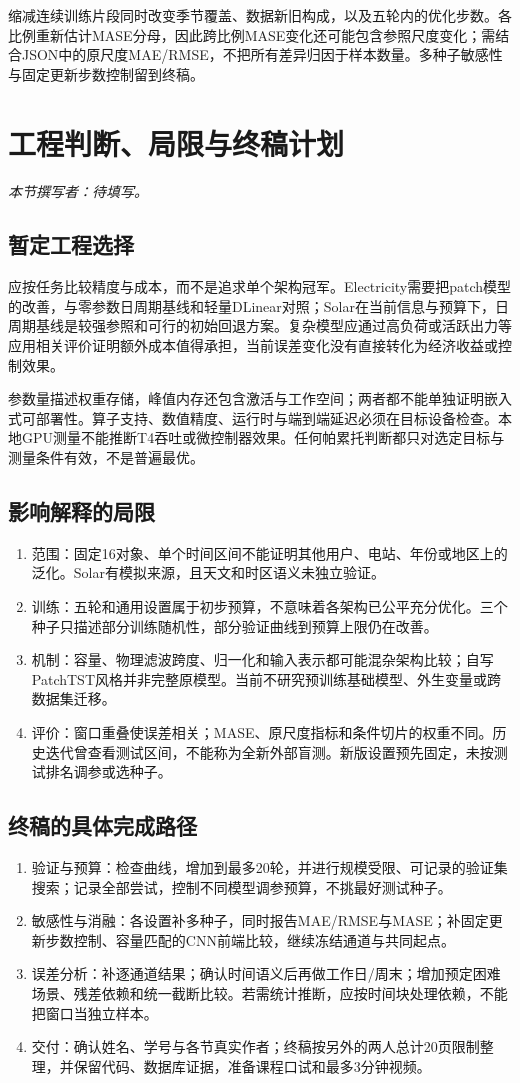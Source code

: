 \documentclass[10pt,a4paper]{article}
\begin{document}
缩减连续训练片段同时改变季节覆盖、数据新旧构成，以及五轮内的优化步数。各比例重新估计MASE分母，因此跨比例MASE变化还可能包含参照尺度变化；需结合JSON中的原尺度MAE/RMSE，不把所有差异归因于样本数量。多种子敏感性与固定更新步数控制留到终稿。

\clearpage
\section{工程判断、局限与终稿计划}
\noindent\textit{本节撰写者：待填写。}


\subsection{暂定工程选择}
应按任务比较精度与成本，而不是追求单个架构冠军。Electricity需要把patch模型的改善，与零参数日周期基线和轻量DLinear对照；Solar在当前信息与预算下，日周期基线是较强参照和可行的初始回退方案。复杂模型应通过高负荷或活跃出力等应用相关评价证明额外成本值得承担，当前误差变化没有直接转化为经济收益或控制效果。

参数量描述权重存储，峰值内存还包含激活与工作空间；两者都不能单独证明嵌入式可部署性。算子支持、数值精度、运行时与端到端延迟必须在目标设备检查。本地GPU测量不能推断T4吞吐或微控制器效果。任何帕累托判断都只对选定目标与测量条件有效，不是普遍最优。
\subsection{影响解释的局限}
\begin{enumerate}
\item 范围：固定16对象、单个时间区间不能证明其他用户、电站、年份或地区上的泛化。Solar有模拟来源，且天文和时区语义未独立验证。
\item 训练：五轮和通用设置属于初步预算，不意味着各架构已公平充分优化。三个种子只描述部分训练随机性，部分验证曲线到预算上限仍在改善。
\item 机制：容量、物理滤波跨度、归一化和输入表示都可能混杂架构比较；自写PatchTST风格并非完整原模型。当前不研究预训练基础模型、外生变量或跨数据集迁移。
\item 评价：窗口重叠使误差相关；MASE、原尺度指标和条件切片的权重不同。历史迭代曾查看测试区间，不能称为全新外部盲测。新版设置预先固定，未按测试排名调参或选种子。
\end{enumerate}
\subsection{终稿的具体完成路径}
\begin{enumerate}
\item 验证与预算：检查曲线，增加到最多20轮，并进行规模受限、可记录的验证集搜索；记录全部尝试，控制不同模型调参预算，不挑最好测试种子。
\item 敏感性与消融：各设置补多种子，同时报告MAE/RMSE与MASE；补固定更新步数控制、容量匹配的CNN前端比较，继续冻结通道与共同起点。
\item 误差分析：补逐通道结果；确认时间语义后再做工作日/周末；增加预定困难场景、残差依赖和统一截断比较。若需统计推断，应按时间块处理依赖，不能把窗口当独立样本。
\item 交付：确认姓名、学号与各节真实作者；终稿按另外的两人总计20页限制整理，并保留代码、数据库证据，准备课程口试和最多3分钟视频\cite{course}。
\end{enumerate}
\end{document}
